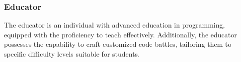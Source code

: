 \subsubsection{Educator}
The educator is an individual with advanced education in programming, equipped with the proficiency to teach effectively. Additionally, the educator possesses the capability to craft customized code battles, tailoring them to specific difficulty levels suitable for students.






